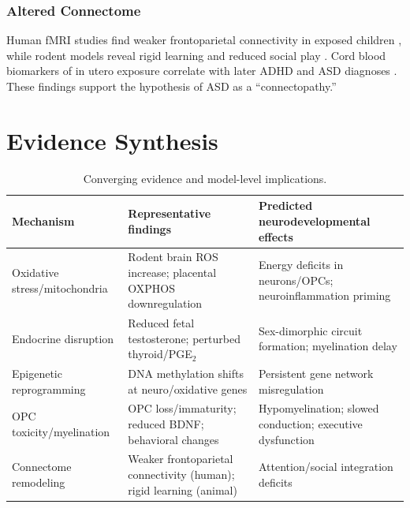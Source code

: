 \documentclass[12pt]{article}
\begin{document}
\subsubsection{Altered Connectome}
Human fMRI studies find weaker frontoparietal connectivity in exposed children \citep{baker2020}, while rodent models reveal rigid learning and reduced social play \citep{viberg2014,blecharz2018}. Cord blood biomarkers of in utero exposure correlate with later ADHD and ASD diagnoses \citep{ji2020}. These findings support the hypothesis of ASD as a ``connectopathy.''

\section{Evidence Synthesis}
\begin{table}[h]
  \centering
  \small
  \begin{tabular}{@{}p{3.2cm} p{6.6cm} p{5.2cm}@{}}
  \toprule
  Mechanism & Representative findings & Predicted neurodevelopmental effects \\
  \midrule
  Oxidative stress/mitochondria & Rodent brain ROS increase; placental OXPHOS downregulation & Energy deficits in neurons/OPCs; neuroinflammation priming \\
  Endocrine disruption & Reduced fetal testosterone; perturbed thyroid/PGE$_2$ & Sex-dimorphic circuit formation; myelination delay \\
  Epigenetic reprogramming & DNA methylation shifts at neuro/oxidative genes & Persistent gene network misregulation \\
  OPC toxicity/myelination & OPC loss/immaturity; reduced BDNF; behavioral changes & Hypomyelination; slowed conduction; executive dysfunction \\
  Connectome remodeling & Weaker frontoparietal connectivity (human); rigid learning (animal) & Attention/social integration deficits \\
  \bottomrule
  \end{tabular}
  \caption{Converging evidence and model-level implications.}
\end{table}

\end{document}
